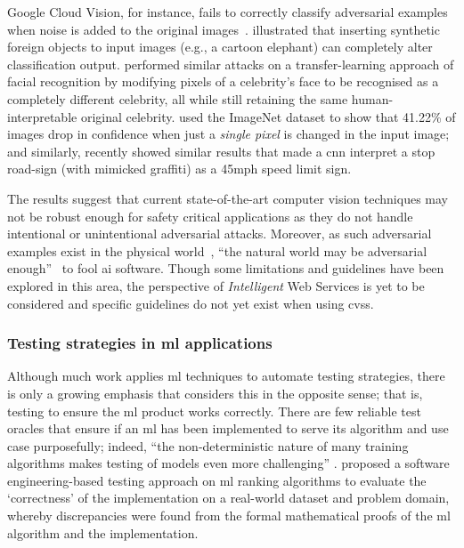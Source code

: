 Google Cloud Vision, for instance, fails to correctly classify adversarial examples when noise is added to the original images~\citep{Hosseini:2018jr}. \citet{Rosenfeld:2018ut} illustrated that inserting synthetic foreign objects to input images (e.g., a cartoon elephant) can completely alter classification output. \citet{Wang:2018vl} performed similar attacks on a transfer-learning approach of facial recognition by modifying pixels of a celebrity's face to be recognised as a completely different celebrity, all while still retaining the same human-interpretable original celebrity. \citet{Su:2017uw} used the ImageNet dataset to show that 41.22\% of images drop in confidence when just a \textit{single pixel} is changed in the input image; and similarly, \citet{Eykholt:2018vk} recently showed similar results that made a \gls{cnn} interpret a stop road-sign (with mimicked graffiti) as a 45mph speed limit sign.

The results suggest that current state-of-the-art computer vision techniques may not be robust enough for safety critical applications as they do not handle intentional or unintentional adversarial attacks. Moreover, as such adversarial examples exist in the physical world~\citep{Kurakin:2016vw,Eykholt:2018vk}, ``the natural world may be adversarial enough''~\citep{Pezzementi:2018tq} to fool \gls{ai} software. Though some limitations and guidelines have been explored in this area, the perspective of \textit{Intelligent} Web Services is yet to be considered and specific guidelines do not yet exist when using \glspl{cvs}.

\subsubsection[Testing strategies in ML applications]{Testing strategies in \gls{ml} applications}

Although much work applies \gls{ml} techniques to automate testing strategies, there is only a growing emphasis that considers this in the opposite sense; that is, testing to ensure the \gls{ml} product works correctly. There are few reliable test oracles that ensure if an \gls{ml} has been implemented to serve its algorithm and use case purposefully; indeed, ``the non-deterministic nature of many training algorithms makes testing of models even more challenging'' \citep{Arpteg2018}.
\citet{murphy2007approach} proposed a software engineering-based testing approach on \gls{ml} ranking algorithms to evaluate the `correctness' of the implementation on a real-world dataset and problem domain, whereby discrepancies were found from the formal mathematical proofs of the \gls{ml} algorithm and the implementation. 

